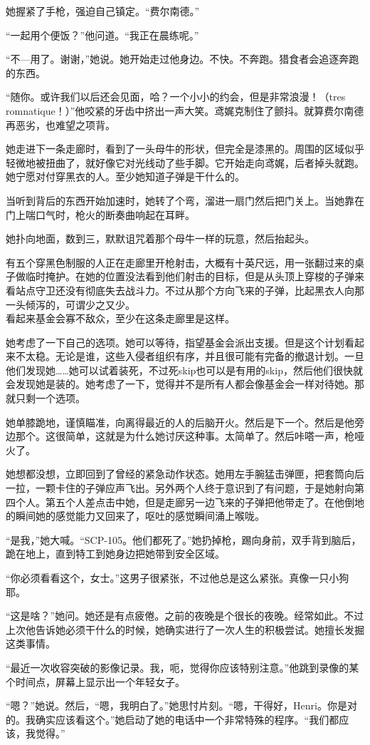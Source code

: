 她握紧了手枪，强迫自己镇定。“费尔南德。”

“一起用个便饭？”他问道。“我正在晨练呢。”

“不—用了。谢谢，”她说。她开始走过他身边。不快。不奔跑。猎食者会追逐奔跑的东西。

“随你。或许我们以后还会见面，哈？一个小小的约会，但是非常浪漫！（tres romnatique！）”他咬紧的牙齿中挤出一声大笑。鸢娓克制住了颤抖。就算费尔南德再恶劣，也难望之项背。

她走进下一条走廊时，看到了一头母牛的形状，但完全是漆黑的。周围的区域似乎轻微地被扭曲了，就好像它对光线动了些手脚。它开始走向鸢娓，后者掉头就跑。她宁愿对付穿黑衣的人。至少她知道子弹是干什么的。

当听到背后的东西开始加速时，她转了个弯，溜进一扇门然后把门关上。当她靠在门上喘口气时，枪火的断奏曲响起在耳畔。

她扑向地面，数到三，默默诅咒着那个母牛一样的玩意，然后抬起头。

有五个穿黑色制服的人正在走廊里开枪射击，大概有十英尺远，用一张翻过来的桌子做临时掩护。在她的位置没法看到他们射击的目标，但是从头顶上穿梭的子弹来看站点守卫还没有彻底失去战斗力。不过从那个方向飞来的子弹，比起黑衣人向那一头倾泻的，可谓少之又少。\\
看起来基金会寡不敌众，至少在这条走廊里是这样。

她考虑了一下自己的选项。她可以等待，指望基金会派出支援。但是这个计划看起来不太稳。无论是谁，这些入侵者组织有序，并且很可能有完备的撤退计划。一旦他们发现她……她可以试着装死，不过死skip也可以是有用的skip，然后他们很快就会发现她是装的。她考虑了一下，觉得并不是所有人都会像基金会一样对待她。那就只剩一个选项。

她单膝跪地，谨慎瞄准，向离得最近的人的后脑开火。然后是下一个。然后是他旁边那个。这很简单，这就是为什么她讨厌这种事。太简单了。然后咔嗒一声，枪哑火了。

她想都没想，立即回到了曾经的紧急动作状态。她用左手腕猛击弹匣，把套筒向后一拉，一颗卡住的子弹应声飞出。另外两个人终于意识到了有问题，于是她射向第四个人。第五个人差点击中她，但是走廊另一边飞来的子弹把他带走了。在他倒地的瞬间她的感觉能力又回来了，呕吐的感觉瞬间涌上喉咙。

“是我，”她大喊。“SCP-105。他们都死了。”她扔掉枪，踢向身前，双手背到脑后，跪在地上，直到特工到她身边把她带到安全区域。

\hr

“你必须看看这个，女士。”这男子很紧张，不过他总是这么紧张。真像一只小狗耶。

“这是啥？”她问。她还是有点疲倦。之前的夜晚是个很长的夜晚。经常如此。不过上次他告诉她必须干什么的时候，她确实进行了一次人生的积极尝试。她擅长发掘这类事情。

“最近一次收容突破的影像记录。我，呃，觉得你应该特别注意。”他跳到录像的某个时间点，屏幕上显示出一个年轻女子。

“嗯？”她说。然后，“嗯，我明白了。”她思忖片刻。“嗯，干得好，Henri。你是对的。我确实应该看这个。”她启动了她的电话中一个非常特殊的程序。“我们都应该，我觉得。”
